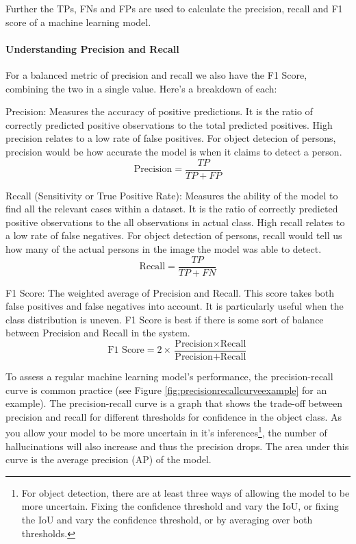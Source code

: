 Further the TPs, FNs and FPs are used to calculate the precision, recall and F1 score of a machine learning model.

\paragraph{Understanding Precision and Recall}
\label{sec:understandingprecision}
For a balanced metric of precision and recall we also have the F1 Score, combining the two in a single value. Here’s a breakdown of each:

Precision: Measures the accuracy of positive predictions. It is the ratio of correctly predicted positive observations to the total predicted positives. High precision relates to a low rate of false positives. For object detecion of persons, precision would be how accurate the model is when it claims to detect a person.
\begin{equation}
    \text{Precision} = \frac{TP}{TP + FP}
\end{equation}

Recall (Sensitivity or True Positive Rate): Measures the ability of the model to find all the relevant cases within a dataset. It is the ratio of correctly predicted positive observations to the all observations in actual class. High recall relates to a low rate of false negatives. For object detection of persons, recall would tell us how many of the actual persons in the image the model was able to detect.
\begin{equation}
    \text{Recall} = \frac{TP}{TP + FN}
\end{equation}

F1 Score: The weighted average of Precision and Recall. This score takes both false positives and false negatives into account. It is particularly useful when the class distribution is uneven. F1 Score is best if there is some sort of balance between Precision and Recall in the system.
\begin{equation}
    \text{F1 Score} = 2 \times \frac{\text{Precision} \times \text{Recall}}{\text{Precision} + \text{Recall}}
\end{equation}

To assess a regular machine learning model's performance, the precision-recall curve is common practice (see Figure \ref{fig:precisionrecallcurveexample} for an example). The precision-recall curve is a graph that shows the trade-off between precision and recall for different thresholds for confidence in the object class. As you allow your model to be more uncertain in it's inferences\footnote{For object detection, there are at least three ways of allowing the model to be more uncertain. Fixing the confidence threshold and vary the IoU, or fixing the IoU and vary the confidence threshold, or by averaging over both thresholds.}, the number of hallucinations will also increase and thus the precision drops. The area under this curve is the average precision (AP) of the model.

